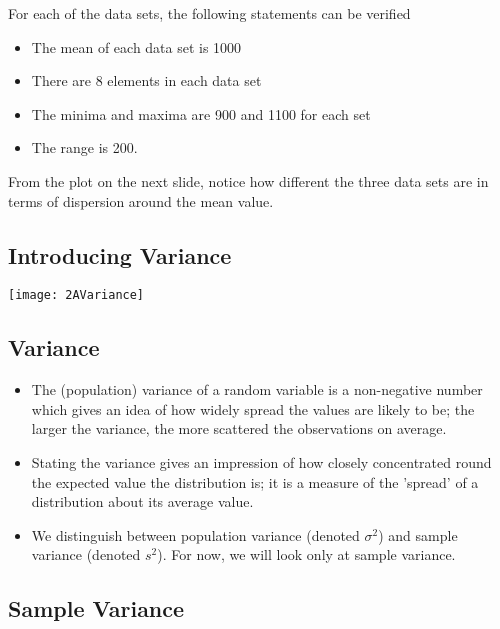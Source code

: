 For each of the data sets, the following statements can be verified

\begin{itemize}
\item The mean of each data set is 1000
\item There are 8 elements in each data set
\item The minima and maxima are 900 and 1100 for each set
\item The range is 200.
\end{itemize}

From the plot on the next slide, notice how different the three data sets are in terms of dispersion around the mean value.


\subsection{Introducing Variance}


\begin{center}
\texttt{[image: 2AVariance]}
\end{center}


\subsection{Variance}


\begin{itemize}

\item The (population) variance of a random variable is a non-negative number which gives an idea of how widely spread the values are likely to be; the larger the variance, the more scattered the observations on average.

\item Stating the variance gives an impression of how closely concentrated round the expected value the distribution is; it is a measure of the 'spread' of a distribution about its average value.

\item We distinguish between population variance (denoted $\sigma^2$) and sample variance (denoted $s^2$). For now, we will look only at sample variance.

\end{itemize}




\subsection{Sample Variance}

